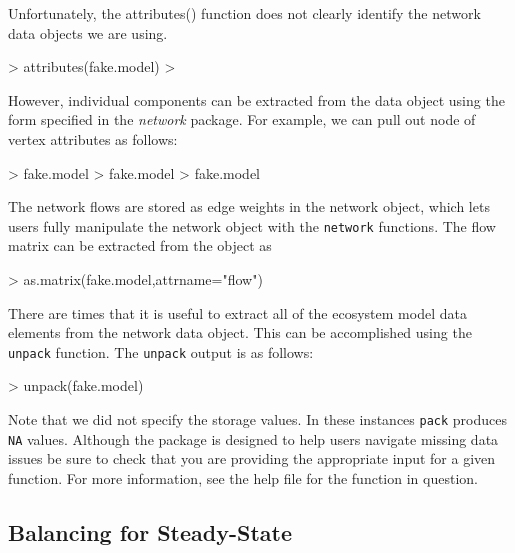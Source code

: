 \documentclass[article]{jss}
\begin{document}
Unfortunately, the attributes() function does not clearly identify the
network data objects we are using.

\begin{Schunk}
\begin{Sinput}
> attributes(fake.model)
> 
\end{Sinput}
\end{Schunk}

However, individual components can be extracted from the data object
using the form specified in the \textit{network} package.  For
example, we can pull out node of vertex attributes as follows:

\begin{Schunk}
\begin{Sinput}
> fake.model%
> fake.model%
> fake.model%
\end{Sinput}
\end{Schunk}

The network flows are stored as edge weights in the network object,
which lets users fully manipulate the network object with the
\texttt{network} functions.  The flow matrix can be extracted from the
object as

\begin{Schunk}
\begin{Sinput}
> as.matrix(fake.model,attrname="flow")
\end{Sinput}
\end{Schunk}

There are times that it is useful to extract all of the ecosystem
model data elements from the network data object.  This can be
accomplished using the \texttt{unpack} function. The \texttt{unpack}
output is as follows:

\begin{Schunk}
\begin{Sinput}
> unpack(fake.model)
\end{Sinput}
\end{Schunk}

Note that we did not specify the storage values. In these instances
\texttt{pack} produces \texttt{NA} values. Although the package is
designed to help users navigate missing data issues be sure to check
that you are providing the appropriate input for a given function. For
more information, see the help file for the function in question.

\subsection{Balancing for Steady-State}
\end{document}
